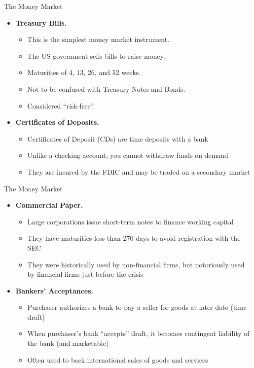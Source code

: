 \documentclass{beamer}
\begin{document}
\begin{frame}{The Money Market}
\begin{itemize}
\item[1.]\textbf{Treasury Bills.} 
\begin{itemize}
\item This is the simplest money market instrument.
\item The US government sells bills to raise money.
\item Maturities of 4, 13, 26, and 52 weeks. 
\item Not to be confused with Treasury Notes and Bonds. 
\item Considered ``risk-free''.
\end{itemize}
\item[2.]\textbf{Certificates of Deposits.} 
\begin{itemize}
\item Certificates of Deposit (CDs) are time deposits with a bank 
\item Unlike a checking account, you cannot withdraw funds on demand
\item They are insured by the FDIC and may be traded on a secondary market
\end{itemize}
\end{itemize}
\end{frame}

\begin{frame}{The Money Market}
\begin{itemize}
\item[3.]\textbf{Commercial Paper.} 
\begin{itemize}
\item Large corporations issue short-term notes to finance working capital
\item They have maturities less than 270 days to avoid registration with the SEC
\item They were historically used by non-financial firms, but notoriously used by financial firms just before the crisis  
\end{itemize}
\item[4.]\textbf{Bankers' Acceptances.} 
\begin{itemize}
\item Purchaser authorizes a bank to pay a seller for goods at later date (time draft)
\item When purchaser’s bank “accepts” draft, it becomes contingent liability of the bank (and marketable)
\item Often used to back international sales of goods and services
\end{itemize}
\end{itemize}
\end{frame}
\end{document}

